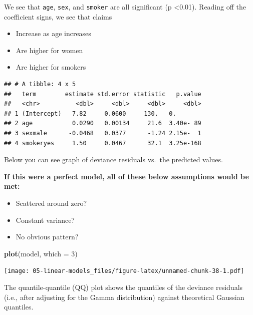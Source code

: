 \documentclass[
  openany]{book}
\newenvironment{Shaded}{\begin{snugshade}}{\end{snugshade}}
\newcommand{\DataTypeTok}[1]{\textcolor[rgb]{0.13,0.29,0.53}{#1}}
\newcommand{\DecValTok}[1]{\textcolor[rgb]{0.00,0.00,0.81}{#1}}
\newcommand{\KeywordTok}[1]{\textcolor[rgb]{0.13,0.29,0.53}{\textbf{#1}}}
\newcommand{\NormalTok}[1]{#1}
\newcommand{\OperatorTok}[1]{\textcolor[rgb]{0.81,0.36,0.00}{\textbf{#1}}}
\newcommand{\StringTok}[1]{\textcolor[rgb]{0.31,0.60,0.02}{#1}}
\providecommand{\tightlist}{%
  \setlength{\itemsep}{0pt}\setlength{\parskip}{0pt}}
\begin{document}
We see that \texttt{age}, \texttt{sex}, and \texttt{smoker} are all significant (p \textless0.01). Reading off the coefficient signs, we see that claims

\begin{itemize}
\tightlist
\item
  Increase as age increases
\item
  Are higher for women
\item
  Are higher for smokers
\end{itemize}

\begin{Shaded}
\end{Shaded}

\begin{verbatim}
## # A tibble: 4 x 5
##   term        estimate std.error statistic   p.value
##   <chr>          <dbl>     <dbl>     <dbl>     <dbl>
## 1 (Intercept)   7.82     0.0600     130.   0.       
## 2 age           0.0290   0.00134     21.6  3.40e- 89
## 3 sexmale      -0.0468   0.0377      -1.24 2.15e-  1
## 4 smokeryes     1.50     0.0467      32.1  3.25e-168
\end{verbatim}

Below you can see graph of deviance residuals vs.~the predicted values.

\textbf{If this were a perfect model, all of these below assumptions would be met:}

\begin{itemize}
\tightlist
\item
  Scattered around zero?
\item
  Constant variance?
\item
  No obvious pattern?
\end{itemize}

\begin{Shaded}
\begin{Highlighting}[]
\KeywordTok{plot}\NormalTok{(model, }\DataTypeTok{which =} \DecValTok{3}\NormalTok{)}
\end{Highlighting}
\end{Shaded}

\texttt{[image: 05-linear-models\_files/figure-latex/unnamed-chunk-38-1.pdf]}

The quantile-quantile (QQ) plot shows the quantiles of the deviance residuals (i.e., after adjusting for the Gamma distribution) against theoretical Gaussian quantiles.
\end{document}
